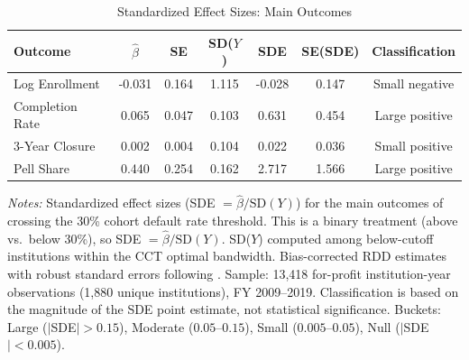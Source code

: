 \begin{table}[t]
\centering
\caption{Standardized Effect Sizes: Main Outcomes}
\label{tab:sde}
\begin{tabular}{lcccccc}
\toprule
Outcome & $\hat{\beta}$ & SE & SD($Y$) & SDE & SE(SDE) & Classification \\
\midrule
Log Enrollment & -0.031 & 0.164 & 1.115 & -0.028 & 0.147 & Small negative \\
Completion Rate & 0.065 & 0.047 & 0.103 & 0.631 & 0.454 & Large positive \\
3-Year Closure & 0.002 & 0.004 & 0.104 & 0.022 & 0.036 & Small positive \\
Pell Share & 0.440 & 0.254 & 0.162 & 2.717 & 1.566 & Large positive \\
\bottomrule
\end{tabular}
\begin{minipage}{0.95\textwidth}
\vspace{0.5em}\footnotesize
\textit{Notes:} Standardized effect sizes (SDE $= \hat{\beta} / \text{SD}(Y)$) for the main outcomes of crossing the 30\% cohort default rate threshold. This is a binary treatment (above vs.\ below 30\%), so SDE $= \hat{\beta} / \text{SD}(Y)$. SD($Y$) computed among below-cutoff institutions within the CCT optimal bandwidth. Bias-corrected RDD estimates with robust standard errors following \citet{cattaneo2020}. Sample: 13,418 for-profit institution-year observations (1,880 unique institutions), FY 2009--2019. Classification is based on the magnitude of the SDE point estimate, not statistical significance. Buckets: Large ($|$SDE$|>0.15$), Moderate ($0.05$--$0.15$), Small ($0.005$--$0.05$), Null ($|$SDE$|<0.005$).
\end{minipage}
\end{table}
